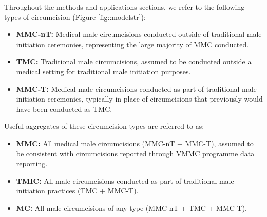 \documentclass{article}
\begin{document}
\begin{appendix}
\noindent Throughout the methods and applications sections, we refer to the following types of circumcision (Figure \ref{fig::modelstr}):
\begin{itemize}
    \item \textbf{MMC-nT:} Medical male circumcisions conducted outside of traditional male initiation ceremonies, representing the large majority of MMC conducted.
    \item \textbf{TMC:} Traditional male circumcisions, assumed to be conducted outside a medical setting for traditional male initiation purposes.
    \item \textbf{MMC-T:} Medical male circumcisions conducted as part of traditional male initiation ceremonies, typically in place of circumcisions that previously would have been conducted as TMC.
\end{itemize}
Useful aggregates of these circumcision types are referred to as:
\begin{itemize}
    \item \textbf{MMC:} All medical male circumcisions (MMC-nT + MMC-T), assumed to be consistent with circumcisions reported through VMMC programme data reporting.
    \item \textbf{TMIC:} All male circumcisions conducted as part of traditional male initiation practices (TMC + MMC-T).
    \item \textbf{MC:} All male circumcisions of any type (MMC-nT + TMC + MMC-T).
\end{itemize}


\end{appendix}
\end{document}
